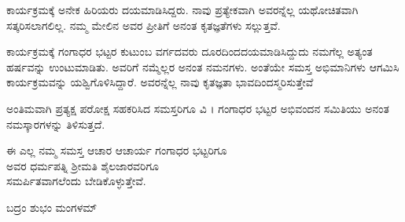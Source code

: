 {ಕಾರ್ಯಕ್ರಮಕ್ಕೆ ಅನೇಕ ಹಿರಿಯರು ದಯಮಾಡಿಸಿದ್ದರು. ನಾವು ಪ್ರತ್ಯೇಕವಾಗಿ ಅವರನ್ನೆಲ್ಲ ಯಥೋಚಿತವಾಗಿ ಸತ್ಕರಿಸಲಾಗಲಿಲ್ಲ. ನಮ್ಮ ಮೇಲಿನ ಅವರ ಪ್ರೀತಿಗೆ ಅನಂತ ಕೃತಜ್ಞತೆಗಳು ಸಲ್ಲುತ್ತವೆ. 
\eject

ಕಾರ್ಯಕ್ರಮಕ್ಕೆ ಗಂಗಾಧರ ಭಟ್ಟರ ಕುಟುಂಬ ವರ್ಗದವರು ದೂರದಿಂದ\break ದಯಮಾಡಿಸಿದ್ದುದು ನಮಗೆಲ್ಲ ಅತ್ಯಂತ ಹರ್ಷವನ್ನು ಉಂಟುಮಾಡಿತು. ಅವರಿಗೆ ನಮ್ಮೆಲ್ಲರ ಅನಂತ ನಮನಗಳು. ಅಂತೆಯೇ ಸಮಸ್ತ ಅಭಿಮಾನಿಗಳು ಆಗಮಿಸಿ ಕಾರ್ಯಕ್ರಮವನ್ನು ಯಶ್ವಿಗೊಳಿಸಿದ್ದಾರೆ. ಅವರನ್ನೆಲ್ಲ ನಾವು ಕೃತಜ್ಞತಾ ಭಾವದಿಂದ\break ಸ್ಮರಿಸುತ್ತೇವೆ 

ಅಂತಿಮವಾಗಿ ಪ್ರತ್ಯಕ್ಷ ಪರೋಕ್ಷ ಸಹಕರಿಸಿದ ಸಮಸ್ತರಿಗೂ ವಿ । ಗಂಗಾಧರ ಭಟ್ಟರ ಅಭಿವಂದನ ಸಮಿತಿಯು ಅನಂತ ನಮಸ್ಕಾರಗಳನ್ನು ತಿಳಿಸುತ್ತದೆ.

\begin{center}
ಈ ಎಲ್ಲ ನಮ್ಮ ಸಮಸ್ತ ಆಚಾರ  ಆಚಾರ್ಯ ಗಂಗಾಧರ ಭಟ್ಟರಿಗೂ\\ ಅವರ ಧರ್ಮಪತ್ನಿ ಶ್ರೀಮತಿ ಶೈಲಜಾರವರಿಗೂ\\ ಸಮರ್ಪಿತವಾಗಲೆಂದು ಬೇಡಿಕೊಳ್ಳುತ್ತೇವೆ.
\medskip

ಬದ್ರಂ ಶುಭಂ ಮಂಗಳಮ್
\end{center}

\articleend
}
